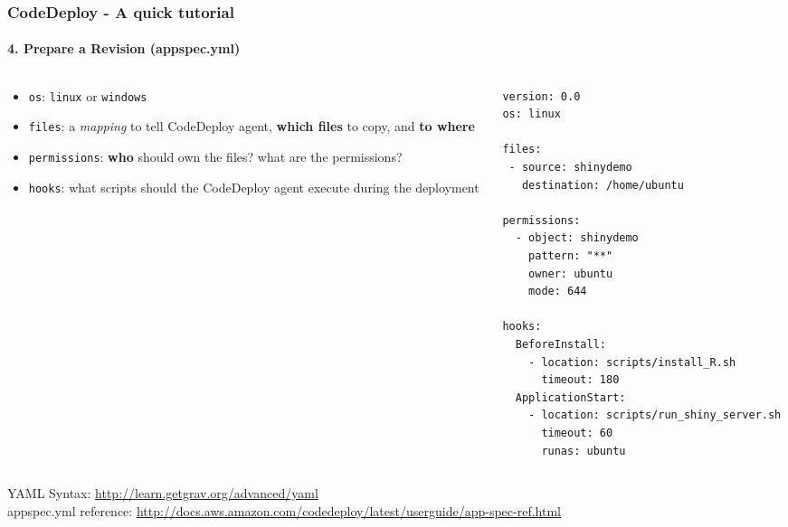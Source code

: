 \documentclass[10pt]{beamer}
\begin{document}
\begin{frame}[fragile]
    \frametitle{CodeDeploy - A quick tutorial}
    \framesubtitle{4. Prepare a Revision (appspec.yml)}
    \vspace{-0.07in}
    \begin{columns}
        \begin{column}{0.4\textwidth}
            \begin{itemize}
                \item {\tt os}: {\tt linux} or {\tt windows}
                \item {\tt files}: a {\it mapping} to tell CodeDeploy agent, {\bf which files} to copy, and {\bf to where}
                \item {\tt permissions}: {\bf who} should own the files? what are the permissions?
                \item {\tt hooks}: what scripts should the CodeDeploy agent execute during the deployment
            \end{itemize}

        \end{column}
        \begin{column}{0.6\textwidth}
            {\footnotesize
            \begin{verbatim}
version: 0.0
os: linux

files:
 - source: shinydemo
   destination: /home/ubuntu

permissions:
  - object: shinydemo
    pattern: "**"
    owner: ubuntu
    mode: 644

hooks:
  BeforeInstall:
    - location: scripts/install_R.sh
      timeout: 180
  ApplicationStart:
    - location: scripts/run_shiny_server.sh
      timeout: 60
      runas: ubuntu
            \end{verbatim}
}
        \end{column}
    \end{columns}

    {\tiny YAML Syntax: \url{http://learn.getgrav.org/advanced/yaml}}\\
    {\tiny appspec.yml reference: \url{http://docs.aws.amazon.com/codedeploy/latest/userguide/app-spec-ref.html}}
\end{frame}
\end{document}

